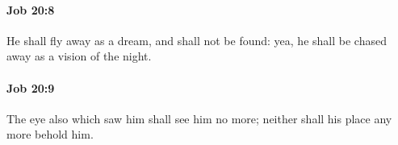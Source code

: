 		\paragraph{Job 20:8} %
			\label{JOB-20-8}

			He shall fly away as a dream, and shall not be found: yea, he shall be chased away as a vision of the night.


		\paragraph{Job 20:9} %
			\label{JOB-20-9}

			The eye also which saw him shall see him no more; neither shall his place any more behold him.


